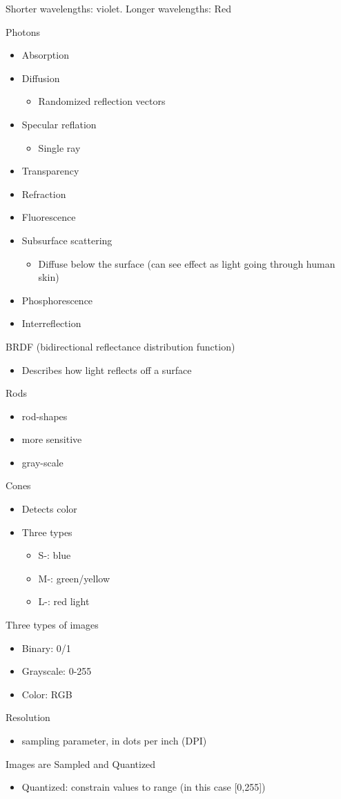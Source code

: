 Shorter wavelengths: violet. Longer wavelengths: Red

Photons
\begin{itemize}
    \item Absorption
    \item Diffusion
    \begin{itemize}
        \item Randomized reflection vectors
    \end{itemize}
    \item Specular reflation
    \begin{itemize}
        \item Single ray
    \end{itemize}
    \item Transparency
    \item Refraction
    \item Fluorescence
    \item Subsurface scattering
    \begin{itemize}
        \item Diffuse below the surface (can see effect as light going through human skin)
    \end{itemize}
    \item Phosphorescence
    \item Interreflection
\end{itemize}
BRDF (bidirectional reflectance distribution function)
\begin{itemize}
    \item Describes how light reflects off a surface
\end{itemize}
Rods
\begin{itemize}
    \item rod-shapes
    \item more sensitive
    \item gray-scale
\end{itemize}
Cones
\begin{itemize}
    \item Detects color
    \item Three types
    \begin{itemize}
        \item S-: blue
        \item M-: green/yellow
        \item L-: red light
    \end{itemize}
\end{itemize}
Three types of images
\begin{itemize}
    \item Binary: 0/1
    \item Grayscale: 0-255
    \item Color: RGB
\end{itemize}
Resolution
\begin{itemize}
    \item sampling parameter, in dots per inch (DPI)
\end{itemize}
Images are Sampled and Quantized
\begin{itemize}
    \item Quantized: constrain values to range (in this case [0,255])
\end{itemize}
